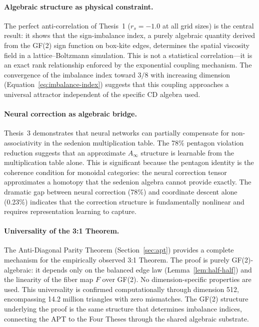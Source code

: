 \documentclass[12pt]{article}
\theoremstyle{definition}
\theoremstyle{plain}
\theoremstyle{remark}
\begin{document}
\paragraph{Algebraic structure as physical constraint.}
The perfect anti-correlation of Thesis~1 ($r_s = -1.0$ at all grid sizes)
is the central result: it shows that the sign-imbalance index, a purely
algebraic quantity derived from the GF(2) sign function on box-kite edges,
determines the spatial viscosity field in a lattice--Boltzmann simulation.
This is not a statistical correlation---it is an exact rank relationship
enforced by the exponential coupling mechanism.  The convergence of the
imbalance index toward $3/8$ with increasing dimension
(Equation~\ref{eq:imbalance-index}) suggests that this coupling approaches a
universal attractor independent of the specific CD algebra used.

\paragraph{Neural correction as algebraic bridge.}
Thesis~3 demonstrates that neural networks can partially compensate for
non-associativity in the sedenion multiplication table.  The 78\% pentagon
violation reduction suggests that an approximate $A_\infty$ structure is
learnable from the multiplication table alone.  This is significant because
the pentagon identity is the coherence condition for monoidal categories:
the neural correction tensor approximates a homotopy that the sedenion
algebra cannot provide exactly.  The dramatic gap between neural correction
(78\%) and coordinate descent alone (0.23\%) indicates that the correction
structure is fundamentally nonlinear and requires representation learning
to capture.

\paragraph{Universality of the 3:1 Theorem.}
The Anti-Diagonal Parity Theorem (Section~\ref{sec:apt}) provides a
complete mechanism for the empirically observed 3:1 Theorem.  The proof
is purely GF(2)-algebraic: it depends only on the balanced edge law
(Lemma~\ref{lem:half-half}) and the linearity of the fiber map $F$ over
GF(2).  No dimension-specific properties are used.  This universality is
confirmed computationally through dimension 512, encompassing 14.2 million
triangles with zero mismatches.  The GF(2) structure underlying the proof
is the same structure that determines imbalance indices, connecting the
APT to the Four Theses through the shared algebraic substrate.
\end{document}
